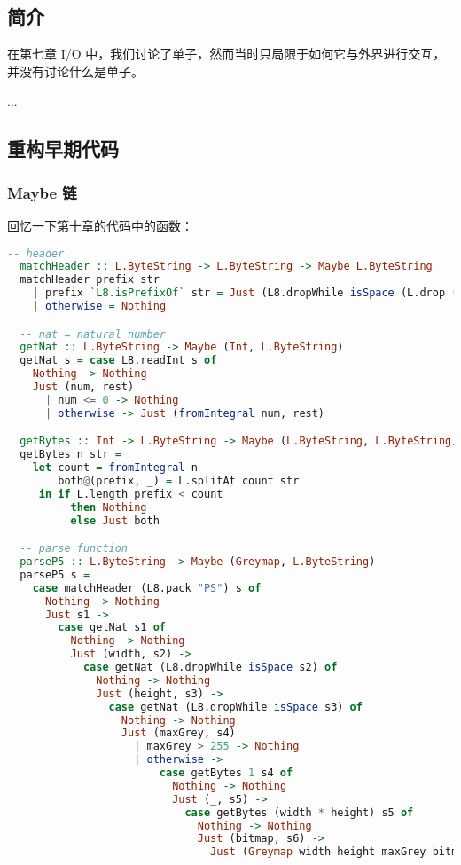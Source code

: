 \documentclass[./main.tex]{subfiles}
\begin{document}
\subsection*{简介}

在第七章 I/O 中，我们讨论了单子，然而当时只局限于如何它与外界进行交互，并没有讨论什么是单子。

...

\subsection*{重构早期代码}

\subsubsection*{Maybe 链}

回忆一下第十章的代码中的函数：

\begin{lstlisting}[language=Haskell]
  -- header
  matchHeader :: L.ByteString -> L.ByteString -> Maybe L.ByteString
  matchHeader prefix str
    | prefix `L8.isPrefixOf` str = Just (L8.dropWhile isSpace (L.drop (L.length prefix) str))
    | otherwise = Nothing

  -- nat = natural number
  getNat :: L.ByteString -> Maybe (Int, L.ByteString)
  getNat s = case L8.readInt s of
    Nothing -> Nothing
    Just (num, rest)
      | num <= 0 -> Nothing
      | otherwise -> Just (fromIntegral num, rest)

  getBytes :: Int -> L.ByteString -> Maybe (L.ByteString, L.ByteString)
  getBytes n str =
    let count = fromIntegral n
        both@(prefix, _) = L.splitAt count str
     in if L.length prefix < count
          then Nothing
          else Just both

  -- parse function
  parseP5 :: L.ByteString -> Maybe (Greymap, L.ByteString)
  parseP5 s =
    case matchHeader (L8.pack "PS") s of
      Nothing -> Nothing
      Just s1 ->
        case getNat s1 of
          Nothing -> Nothing
          Just (width, s2) ->
            case getNat (L8.dropWhile isSpace s2) of
              Nothing -> Nothing
              Just (height, s3) ->
                case getNat (L8.dropWhile isSpace s3) of
                  Nothing -> Nothing
                  Just (maxGrey, s4)
                    | maxGrey > 255 -> Nothing
                    | otherwise ->
                        case getBytes 1 s4 of
                          Nothing -> Nothing
                          Just (_, s5) ->
                            case getBytes (width * height) s5 of
                              Nothing -> Nothing
                              Just (bitmap, s6) ->
                                Just (Greymap width height maxGrey bitmap, s6)
\end{lstlisting}
\end{document}
